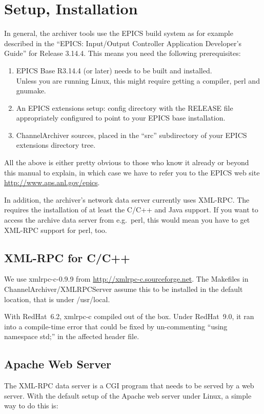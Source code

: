 \chapter{Setup, Installation}
In general, the archiver tools use the EPICS build system as for
example described in the ``EPICS: Input/Output Controller Application
Developer's Guide'' for Release 3.14.4.
This means you need the following prerequisites:
\begin{enumerate}
\item EPICS Base R3.14.4 (or later) needs to be built and installed.\\
      Unless you are running Linux, this might require getting a
      compiler, perl and gnumake.
\item An EPICS extensions setup: config directory with the RELEASE
      file appropriately configured to point to your EPICS base installation.
\item ChannelArchiver sources, placed in the ``src'' subdirectory of
      your EPICS extensions directory tree. 
\end{enumerate}

\noindent All the above is either pretty obvious to those who know it already
or beyond this manual to explain, in which case we have to refer you
to the EPICS web site 
\href{http://www.aps.anl.gov/epics}{http://www.aps.anl.gov/epics}. 

In addition, the archiver's network data server currently uses
XML-RPC. The  requires the installation of at
least the C/C++ and Java support. If you want to access the archive
data server from e.g.\ perl, this would mean you have to get XML-RPC
support for perl, too.

\section{XML-RPC for C/C++}
We use xmlrpc-c-0.9.9 from
\href{http://xmlrpc-c.sourceforge.net}{http://xmlrpc-c.sourceforge.net}.
The Makefiles in ChannelArchiver/XMLRPCServer assume this to be
installed in the default location, that is under /usr/local.

With RedHat~6.2, xmlrpc-c compiled out of the box.
Under RedHat~9.0, it ran into a compile-time error that could be fixed
by un-commenting ``using namespace std;'' in the affected header file.

\section{Apache Web Server}
The XML-RPC data server is a CGI program that needs to be served by a
web server. With the default setup of the Apache web server under
Linux, a simple way to do this is:

